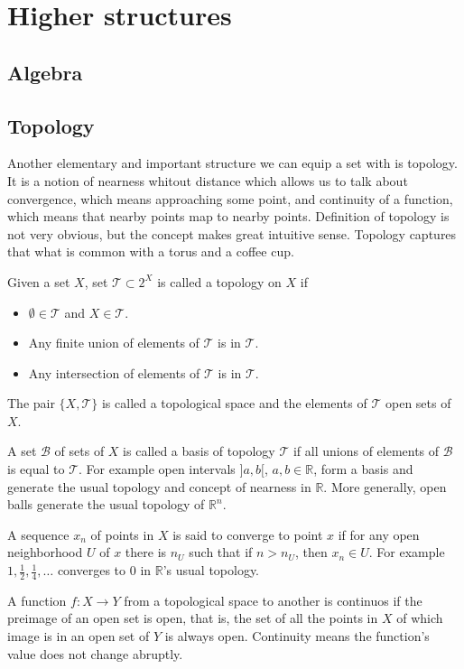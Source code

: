 \documentclass[11pt,oneside,%
]{memoir}
\theoremstyle{definition}
\newcommand{\RR}{\mathbb{R}}
\begin{document}
\part{Higher structures}

\chapter{Algebra}

\chapter{Topology}

Another elementary and important structure we can equip a set with is topology. It is a notion of nearness whitout distance which allows us to talk about convergence, which means approaching some point, and continuity of a function, which means that nearby points map to nearby points. Definition of topology is not very obvious, but the concept makes great intuitive sense. Topology captures that what is common with a torus and a coffee cup.

Given a set \(X\), set \(\mathcal{T}\subset2^X\) is called a topology on \(X\) if
\begin{itemize}
    \item \(\emptyset\in\mathcal{T}\) and \(X\in\mathcal{T}\).
    \item Any finite union of elements of \(\mathcal{T}\) is in \(\mathcal{T}\).
    \item Any intersection of elements of \(\mathcal{T}\) is in \(\mathcal{T}\).
\end{itemize}
The pair \(\lbrace X,\mathcal{T}\rbrace\) is called a topological space and the elements of \(\mathcal{T}\) open sets of \(X\).

A set \(\mathcal{B}\) of sets of \(X\) is called a basis of topology \(\mathcal{T}\) if all unions of elements of \(\mathcal{B}\) is equal to \(\mathcal{T}\). For example open intervals \(]a,b[\), \(a,b\in\RR\), form a basis and generate the usual topology and concept of nearness in \(\RR\). More generally, open balls generate the usual topology of \(\RR^n\).

A sequence \(x_n\) of points in \(X\) is said to converge to point \(x\) if for any open neighborhood \(U\) of \(x\) there is \(n_U\) such that if \(n>n_U\), then \(x_n\in U\). For example \(1,\frac{1}{2},\frac{1}{4},\dotsc\) converges to \(0\) in \(\RR\)'s usual topology.

A function \(f:X\rightarrow Y\) from a topological space to another is continuos if the preimage of an open set is open, that is, the set of all the points in \(X\) of which image is in an open set of \(Y\) is always open. Continuity means the function's value does not change abruptly.
\end{document}
